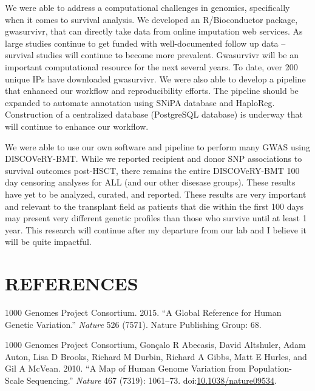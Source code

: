 \documentclass[]{DissertateOSU}
\begin{document}
We were able to address a computational challenges in genomics,
specifically when it comes to survival analysis. We developed an
R/Bioconductor package, gwasurvivr, that can directly take data from
online imputation web services. As large studies continue to get funded
with well-documented follow up data -- survival studies will continue to
become more prevalent. Gwasurvivr will be an important computational
resource for the next several years. To date, over 200 unique IPs have
downloaded gwasurvivr. We were also able to develop a pipeline that
enhanced our workflow and reproducibility efforts. The pipeline should
be expanded to automate annotation using SNiPA database and HaploReg.
Construction of a centralized database (PostgreSQL database) is underway
that will continue to enhance our workflow.

We were able to use our own software and pipeline to perform many GWAS
using DISCOVeRY-BMT. While we reported recipient and donor SNP
associations to survival outcomes post-HSCT, there remains the entire
DISCOVeRY-BMT 100 day censoring analyses for ALL (and our other disesase
groups). These results have yet to be analyzed, curated, and reported.
These results are very important and relevant to the transplant field as
patients that die within the first 100 days may present very different
genetic profiles than those who survive until at least 1 year. This
research will continue after my departure from our lab and I believe it
will be quite impactful.

\FloatBarrier

\newpage

\pagestyle{plain} \fancyhead[L]{} \fancyhead[R]{}
\fancyfoot[C]{\thepage}

\chapter*{REFERENCES}

\singlespacing
\setlength{\parindent}{-0.5in} \setlength{\leftskip}{0.4in}
\setlength{\parskip}{12pt}

\hypertarget{refs}{}
\hypertarget{ref-1000genomes}{}
1000 Genomes Project Consortium. 2015. ``A Global Reference for Human
Genetic Variation.'' \emph{Nature} 526 (7571). Nature Publishing Group:
68.

\hypertarget{ref-1kb_phase1}{}
1000 Genomes Project Consortium, Gonçalo R Abecasis, David Altshuler,
Adam Auton, Lisa D Brooks, Richard M Durbin, Richard A Gibbs, Matt E
Hurles, and Gil A McVean. 2010. ``A Map of Human Genome Variation from
Population-Scale Sequencing.'' \emph{Nature} 467 (7319): 1061--73.
doi:\href{https://doi.org/10.1038/nature09534}{10.1038/nature09534}.
\end{document}
